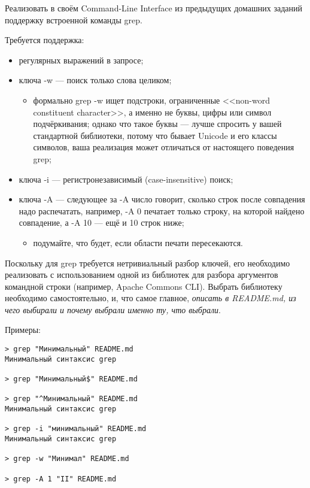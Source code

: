 \documentclass[a5paper]{homework}
\begin{document}

Реализовать в своём Command-Line Interface из предыдущих домашних заданий поддержку встроенной команды grep.

Требуется поддержка:

\begin{itemize}
    \item регулярных выражений в запросе;
    \item ключа -w --- поиск только слова целиком;
    \begin{itemize}
        \item формально grep -w ищет подстроки, ограниченные <<non-word constituent character>>, а именно не буквы, цифры или символ подчёркивания; однако что такое буквы --- лучше спросить у вашей стандартной библиотеки, потому что бывает Unicode и его классы символов, ваша реализация может отличаться от настоящего поведения grep;
    \end{itemize}
    \item ключа -i --- регистронезависимый (case-insensitive) поиск;
    \item ключа -A --- следующее за -A число говорит, сколько строк после совпадения надо распечатать, например, -A 0 печатает только строку, на которой найдено совпадение, а -A 10 --- ещё и 10 строк ниже;
    \begin{itemize}
        \item подумайте, что будет, если области печати пересекаются.
    \end{itemize}
\end{itemize}

Поскольку для grep требуется нетривиальный разбор ключей, его необходимо реализовать с использованием одной из библиотек для разбора аргументов командной строки (например, Apache Commons CLI). Выбрать библиотеку необходимо самостоятельно, и, что самое главное, \emph{описать в README.md, из чего выбирали и почему выбрали именно ту, что выбрали}.

Примеры:

\begin{verbatim}
> grep "Минимальный" README.md
Минимальный синтаксис grep

> grep "Минимальный$" README.md

> grep "^Минимальный" README.md
Минимальный синтаксис grep

> grep -i "минимальный" README.md
Минимальный синтаксис grep

> grep -w "Минимал" README.md

> grep -A 1 "II" README.md
\end{verbatim}
\end{document}
